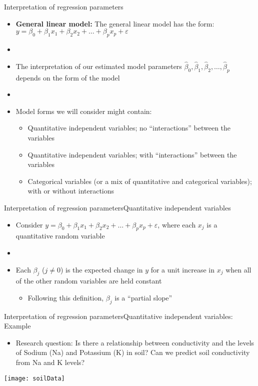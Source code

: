 \documentclass[xcolor=dvipsnames]{beamer}
\begin{document}
\begin{frame}{Interpretation of regression parameters}
	\begin{itemize}
		\item \textbf{General linear model:} The general linear model has the form: $y = \beta_0 + \beta_1 x_1 + \beta_2 x_2 + \hdots + \beta_p x_p + \varepsilon$
		\item[]
		\item The interpretation of our estimated model parameters $\hat{\beta}_0, \hat{\beta}_1, \hat{\beta}_2, \hdots, \hat{\beta}_p$ depends on the form of the model \pause
		\item[]
		\item Model forms we will consider might contain: \pause
		\begin{itemize}
			\item Quantitative independent variables; no ``interactions'' between the variables \pause
			\item Quantitative independent variables; with ``interactions'' between the variables \pause
			\item Categorical variables (or a mix of quantitative and categorical variables); with or without interactions
		\end{itemize}
	\end{itemize}
\end{frame}

\begin{frame}{Interpretation of regression parameters}{Quantitative independent variables}
	\begin{itemize}
		\item Consider $y = \beta_0 + \beta_1 x_1 + \beta_2 x_2 + \hdots + \beta_p x_p + \varepsilon$, where each $x_j$ is a quantitative random variable \pause
		\item[]
		\item Each $\beta_j$ ($j \neq 0$) is the expected change in $y$ for a unit increase in $x_j$ when all of the other random variables are held constant \pause
		\begin{itemize}
			\item Following this definition, $\beta_j$ is a ``partial slope''
		\end{itemize}
	\end{itemize}
\end{frame}

\begin{frame}{Interpretation of regression parameters}{Quantitative independent variables: Example}
	\begin{itemize}
		\item Research question: Is there a relationship between conductivity and the levels of Sodium (Na) and Potassium (K) in soil? Can we predict soil conductivity from Na and K levels?
	\end{itemize}
	\begin{center}
		\texttt{[image: soilData]}
	\end{center}
\end{frame}
\end{document}
